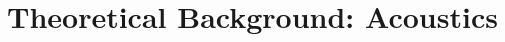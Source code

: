 \renewcommand{\relPath}{SECTION/20_Theory}
\chapter[Theory: Acoustics]{Theoretical Background: 
Acoustics}\label{ch:ac-theory}


